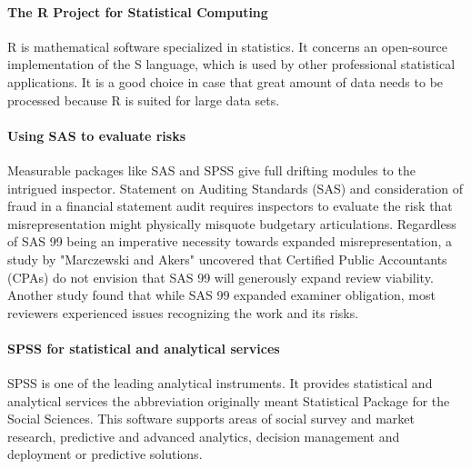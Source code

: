 
\paragraph{The R Project for Statistical Computing} 
R is mathematical software specialized in statistics. It concerns an open-source implementation of the S language, which is used by other professional statistical applications. It is a good choice in case that great amount of data needs to be processed because R is suited for large data sets.


\paragraph{Using SAS to evaluate risks }

Measurable packages like SAS and SPSS give full drifting modules to the intrigued inspector. Statement on Auditing Standards (SAS) and consideration of fraud in a financial statement audit requires inspectors to evaluate the risk that misrepresentation might physically misquote budgetary articulations. Regardless of SAS 99 being an imperative necessity towards expanded misrepresentation, a study by "Marczewski and Akers"\cite{21} uncovered that Certified Public Accountants (CPAs) do not envision that SAS 99 will generously expand review viability. Another study found that while SAS 99 expanded examiner obligation, most reviewers experienced issues recognizing the work and its risks.



\paragraph{SPSS for statistical and analytical services}

SPSS is one of the leading analytical instruments. It provides statistical and analytical services the abbreviation originally meant Statistical Package for the Social Sciences. This software supports areas of social survey and market research, predictive and advanced analytics, decision management and deployment or predictive solutions.


